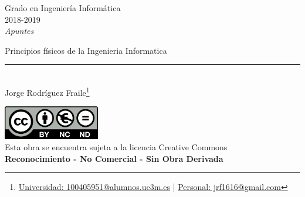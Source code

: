 \documentclass[12pt, twoside, openright]{report} %
\begin{document}
	
\begin{titlepage}
	\begin{sffamily}
	\color{azulUC3M}
	\begin{center}
		\begin{figure}[H] %
		\end{figure}
		\vspace{2.5cm}
		\begin{Large}
			Grado en Ingeniería Informática\\			
			2018-2019\\
			\vspace{2cm}		
			\textsl{Apuntes}\\
			\bigskip
		\end{Large}
		 	{\Huge Principios físicos de la Ingenieria Informatica}\\
		 	\vspace*{0.5cm}
	 		\rule{10.5cm}{0.1mm}\\
			\vspace*{0.9cm}
			{\LARGE Jorge Rodríguez Fraile\footnote{\href{mailto:100405951@alumnos.uc3m.es}{Universidad: 100405951@alumnos.uc3m.es}  |  \href{mailto:jrf1616@gmail.com}{Personal: jrf1616@gmail.com}}}\\ 
			\vspace*{1cm}
	\end{center}
	\vfill
	\color{black}
		\includegraphics[width=4.2cm]{img/creativecommons.png}\\
		Esta obra se encuentra sujeta a la licencia Creative Commons\\ \textbf{Reconocimiento - No Comercial - Sin Obra Derivada}
	\end{sffamily}
\end{titlepage}


\tableofcontents
\thispagestyle{fancy}
\end{document}
